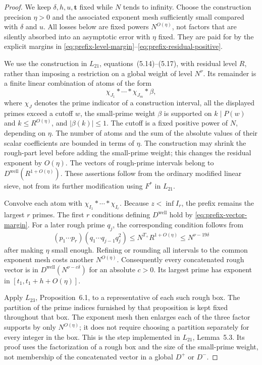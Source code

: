 \documentclass[11pt]{article}
\begin{document}
\begin{proof}
We keep $\delta,h,u,\boldsymbol t$ fixed while $N$ tends to infinity.
Choose the construction precision $\eta>0$ and the associated exponent
mesh sufficiently small compared with $\delta$ and $u$.
All losses below are fixed powers $N^{O(\eta)}$, not factors that are
silently absorbed into an asymptotic error with $\eta$ fixed.
They are paid for by the explicit margins in
\eqref{eq:prefix-level-margin}--\eqref{eq:prefix-residual-positive}.

We use the construction in $L_{21}$, equations~(5.14)--(5.17),
with residual level $R$, rather than imposing a restriction on a
global weight of level $N^\nu$. Its remainder is a finite linear
combination of atoms of the form
\begin{equation}\label{eq:prefix-atom}
 \chi_{J_1}*\cdots*\chi_{J_m}*\beta,
\end{equation}
where $\chi_J$ denotes the prime indicator of a construction interval,
all the displayed primes exceed a cutoff $w$, the small-prime weight
$\beta$ is supported on $k\mid P(w)$ and $k\le R^{O(\eta)}$, and
$|\beta(k)|\le1$. The cutoff is a fixed positive power of $N$,
depending on $\eta$. The number of atoms and the sum of the absolute
values of their scalar coefficients are bounded in terms of $\eta$.
The construction may shrink the rough-part level before adding the
small-prime weight; this changes the residual exponent by $O(\eta)$.
The vectors of rough-prime intervals belong to
$D^{\mathrm{well}}(R^{1+O(\eta)})$. These assertions follow from
the ordinary modified linear sieve, not from its further modification
using $F^*$ in $L_{21}$.

Convolve each atom with $\chi_{I_1}*\cdots*\chi_{I_r}$.
Because $z<\inf I_r$, the prefix remains the largest $r$ primes.
The first $r$ conditions defining $D^{\mathrm{well}}$ hold by
\eqref{eq:prefix-vector-margin}. For a later rough prime $q_j$,
the corresponding condition follows from
\[
 (p_1\cdots p_r)(q_1\cdots q_{j-1}q_j^2)
 \le N^{T_+}R^{1+O(\eta)}
 \le N^{\nu-19\delta}
\]
after making $\eta$ small enough. Refining or rounding all intervals
to the common exponent mesh costs another $N^{O(\eta)}$.
Consequently every concatenated rough vector is in
$D^{\mathrm{well}}(N^{\nu-c\delta})$ for an absolute $c>0$.
Its largest prime has exponent in $[t_1,t_1+h+O(\eta)]$.

Apply $L_{23}$, Proposition~6.1, to a representative of each such
rough box. The partition of the prime indices furnished by that
proposition is kept fixed throughout that box. The exponent mesh
then enlarges each of the three factor supports by only
$N^{O(\eta)}$; it does not require choosing a partition separately
for every integer in the box. This is the step implemented in
$L_{21}$, Lemma~5.3. Its proof uses the factorization of a rough
box and the size of the small-prime weight, not membership of the
concatenated vector in a global $D^+$ or $D^-$.


\end{proof}
\end{document}
